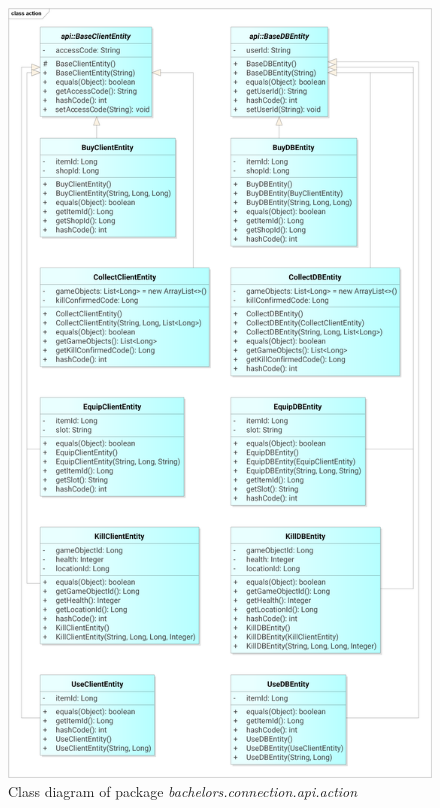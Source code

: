 \begin{figure}[h]	
	\includegraphics[height=0.9\textheight]{figures/classdiagrams/csaction}
	\centering			
	\caption{Class diagram of package \textit{bachelors.connection.api.action}}
\end{figure}





